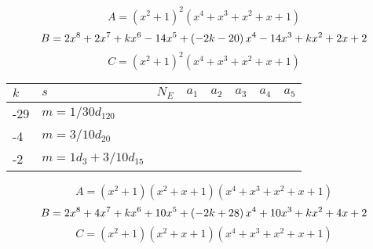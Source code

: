 \documentclass{amsart}
\begin{document}
$$A=(x^2
 + 1)^{2}(x^4
 + x^3
 + x^2
 + x
 + 1)$$
$$B=2\*x^8
 + 2\*x^7
 + k\*x^6
 - 14\*x^5
 + \left(-2\*k
 - 20\right) \*x^4
 - 14\*x^3
 + k\*x^2
 + 2\*x
 + 2$$
$$C=(x^2
 + 1)^{2}(x^4
 + x^3
 + x^2
 + x
 + 1)$$
\begin{longtable}{|l|l|l|lllll|}
\hline
$k$ & $s$ & $N_E$ & $a_1$ & $a_2$ & $a_3$ & $a_4$ & $a_5$\\
\hline
-29&$m=1/30d_{120}$&&\multicolumn{5}{c|}{}\\
-4&$m=3/10d_{20}$&&\multicolumn{5}{c|}{}\\
-2&$m=1d_{3}+3/10d_{15}$&&\multicolumn{5}{c|}{}\\
\hline
\end{longtable}
$$A=(x^2
 + 1)(x^2
 + x
 + 1)(x^4
 + x^3
 + x^2
 + x
 + 1)$$
$$B=2\*x^8
 + 4\*x^7
 + k\*x^6
 + 10\*x^5
 + \left(-2\*k
 + 28\right) \*x^4
 + 10\*x^3
 + k\*x^2
 + 4\*x
 + 2$$
$$C=(x^2
 + 1)(x^2
 + x
 + 1)(x^4
 + x^3
 + x^2
 + x
 + 1)$$
\end{document}
